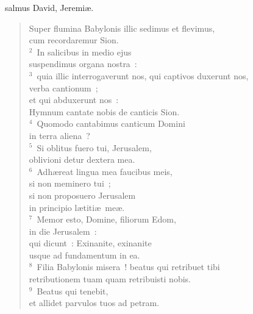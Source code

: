 \bchapter
{}salmus David, Jeremi\ae . \begin{flushleft}\begin{verse}\vspace{6pt}Super flumina Babylonis illic sedimus et flevimus,\\ cum recordaremur Sion.\\
${}^{2}$~In salicibus in medio ejus\\ suspendimus organa nostra~:\\
${}^{3}$~quia illic interrogaverunt nos, qui captivos duxerunt nos,\\ verba cantionum~;\\ et qui abduxerunt nos~:\\ Hymnum cantate nobis de canticis Sion.\\
${}^{4}$~Quomodo cantabimus canticum Domini\\ in terra aliena~?\\
${}^{5}$~Si oblitus fuero tui, Jerusalem,\\ oblivioni detur dextera mea.\\
${}^{6}$~Adh\ae reat lingua mea faucibus meis,\\ si non meminero tui~;\\ si non proposuero Jerusalem\\ in principio l\ae titi\ae\ me\ae .\\
${}^{7}$~Memor esto, Domine, filiorum Edom,\\ in die Jerusalem~:\\ qui dicunt~: Exinanite, exinanite\\ usque ad fundamentum in ea.\\
${}^{8}$~Filia Babylonis misera~! beatus qui retribuet tibi\\ retributionem tuam quam retribuisti nobis.\\
${}^{9}$~Beatus qui tenebit,\\ et allidet parvulos tuos ad petram.\end{verse}\end{flushleft}




